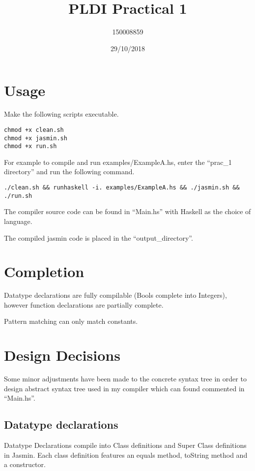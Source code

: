 \documentclass{article}
\title{PLDI Practical 1}
\date{29/10/2018}
\author{150008859}
\begin{document}
\maketitle
\newpage



\section{Usage}

Make the following scripts executable.

\begin{verbatim}
chmod +x clean.sh
chmod +x jasmin.sh
chmod +x run.sh
\end{verbatim}

For example to compile and run examples/ExampleA.hs, enter the ``prac\_1 directory'' and run the following command.

\begin{verbatim}
./clean.sh && runhaskell -i. examples/ExampleA.hs && ./jasmin.sh && ./run.sh
\end{verbatim}

The compiler source code can be found in ``Main.hs'' with Haskell as the choice of language.

The compiled jasmin code is placed in the ``output\_directory''.

\section{Completion}

Datatype declarations are fully compilable (Bools complete into Integers), however function declarations are partially complete.

Pattern matching can only match constants.

\section{Design Decisions}

Some minor adjustments have been made to the concrete syntax tree in order to design abstract syntax tree used in my compiler which can found commented in ``Main.hs''.

\subsection{Datatype declarations}

Datatype Declarations compile into Class definitions and Super Class definitions in Jasmin. Each class definition features an equals method, toString method and a constructor.
\end{document}
